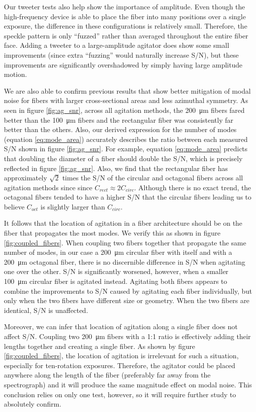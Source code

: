\documentclass[twocolumn]{emulateapj}
\begin{document}
Our tweeter tests also help show the importance of amplitude. Even though the high-frequency device is able to place the fiber into many positions over a single exposure, the difference in these configurations is relatively small. Therefore, the speckle pattern is only ``fuzzed'' rather than averaged throughout the entire fiber face. Adding a tweeter to a large-amplitude agitator does show some small improvements (since extra ``fuzzing'' would naturally increase S/N), but these improvements are significantly overshadowed by simply having large amplitude motion.

We are also able to confirm previous results that show better mitigation of modal noise for fibers with larger cross-sectional areas and less azimuthal symmetry. As seen in figure \ref{fig:ag_snr}, across all agitation methods, the \SI{200}{\micro\meter} fibers fared better than the \SI{100}{\micro\meter} fibers and the rectangular fiber was consistently far better than the others. Also, our derived expression for the number of modes (equation \ref{eq:mode_area}) accurately describes the ratio between each measured S/N shown in figure \ref{fig:ag_snr}. For example, equation \ref{eq:mode_area} predicts that doubling the diameter of a fiber should double the S/N, which is precisely reflected in figure \ref{fig:ag_snr}. Also, we find that the rectangular fiber has approximately $\sqrt{2}$ times the S/N of the circular and octagonal fibers across all agitation methods since since $C_{rect} \approx 2C_{circ}$. Although there is no exact trend, the octagonal fibers tended to have a higher S/N that the circular fibers leading us to believe $C_{oct}$ is slightly larger than $C_{circ}$.

It follows that the location of agitation in a fiber architecture should be on the fiber that propagates the most modes. We verify this as shown in figure \ref{fig:coupled_fibers}. When coupling two fibers together that propagate the same number of modes, in our case a \SI{200}{\micro\meter} circular fiber with itself and with a \SI{200}{\micro\meter} octagonal fiber, there is no discernible difference in S/N when agitating one over the other. S/N is significantly worsened, however, when a smaller \SI{100}{\micro\meter} circular fiber is agitated instead. Agitating both fibers appears to combine the improvements to S/N caused by agitating each fiber individually, but only when the two fibers have different size or geometry. When the two fibers are identical, S/N is unaffected.

Moreover, we can infer that location of agitation along a single fiber does not affect S/N. Coupling two \SI{200}{\micro\meter} fibers with a 1:1 ratio is effectively adding their lengths together and creating a single fiber. As shown by figure \ref{fig:coupled_fibers}, the location of agitation is irrelevant for such a situation, especially for ten-rotation exposures. Therefore, the agitator could be placed anywhere along the length of the fiber (preferably far away from the spectrograph) and it will produce the same magnitude effect on modal noise. This conclusion relies on only one test, however, so it will require further study to absolutely confirm.
\end{document}
